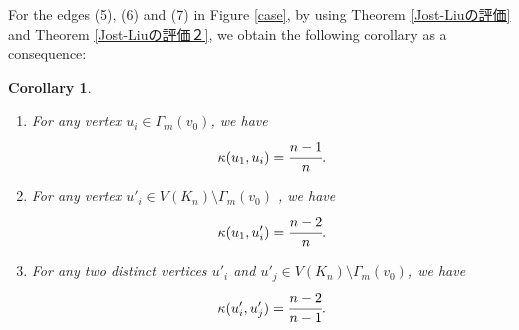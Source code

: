 \documentclass[leqno,12pt]{amsart} %
\theoremstyle{plain} %
\newtheorem{corollary}[theorem]{\indent\sc Corollary}
\theoremstyle{definition} %
\begin{document}
For the edges (5), (6) and (7) in Figure \ref{case}, by using Theorem \ref{Jost-Liuの評価} and Theorem \ref{Jost-Liuの評価２}, we obtain the following corollary as a consequence:
\begin{corollary}
\label{５から７番目}
\begin{enumerate}
\item For any vertex $u_i \in \Gamma_m (v_0)$, we have
\begin{eqnarray*}
\kappa(u_1, u_i) = \cfrac{n- 1}{n}.
\end{eqnarray*}
\item For any vertex $u'_i \in V(K_n) \setminus \Gamma_m (v_0)$ , we have
\begin{eqnarray*}
\kappa(u_1, u'_i) = \cfrac{n-2}{n}.
\end{eqnarray*}
\item For any two distinct vertices $u'_i$ and $u'_j \in V(K_n) \setminus \Gamma_m (v_0)$, we have
\begin{eqnarray*}
\kappa(u'_i, u'_j) = \cfrac{n-2}{n-1}.
\end{eqnarray*}
\end{enumerate}
\end{corollary}

\end{document}
